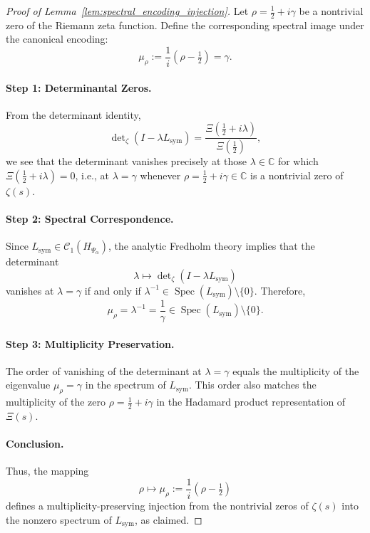 \begin{proof}[Proof of Lemma~\ref{lem:spectral_encoding_injection}]
Let \( \rho = \tfrac{1}{2} + i\gamma \) be a nontrivial zero of the Riemann zeta function. Define the corresponding spectral image under the canonical encoding:
\[
\mu_\rho := \frac{1}{i}(\rho - \tfrac{1}{2}) = \gamma.
\]

\paragraph{Step 1: Determinantal Zeros.}
From the determinant identity,
\[
\det\nolimits_{\zeta}(I - \lambda L_{\mathrm{sym}}) = \frac{\Xi(\tfrac{1}{2} + i\lambda)}{\Xi(\tfrac{1}{2})},
\]
we see that the determinant vanishes precisely at those \( \lambda \in \mathbb{C} \) for which \( \Xi(\tfrac{1}{2} + i\lambda) = 0 \), i.e., at \( \lambda = \gamma \) whenever \( \rho = \tfrac{1}{2} + i\gamma \in \mathbb{C} \) is a nontrivial zero of \( \zeta(s) \).

\paragraph{Step 2: Spectral Correspondence.}
Since \( L_{\mathrm{sym}} \in \mathcal{C}_1(H_{\Psi_\alpha}) \), the analytic Fredholm theory implies that the determinant
\[
\lambda \mapsto \det\nolimits_{\zeta}(I - \lambda L_{\mathrm{sym}})
\]
vanishes at \( \lambda = \gamma \) if and only if \( \lambda^{-1} \in \operatorname{Spec}(L_{\mathrm{sym}}) \setminus \{0\} \). Therefore,
\[
\mu_\rho = \lambda^{-1} = \frac{1}{\gamma} \in \operatorname{Spec}(L_{\mathrm{sym}}) \setminus \{0\}.
\]

\paragraph{Step 3: Multiplicity Preservation.}
The order of vanishing of the determinant at \( \lambda = \gamma \) equals the multiplicity of the eigenvalue \( \mu_\rho = \gamma \) in the spectrum of \( L_{\mathrm{sym}} \). This order also matches the multiplicity of the zero \( \rho = \tfrac{1}{2} + i\gamma \) in the Hadamard product representation of \( \Xi(s) \).

\paragraph{Conclusion.}
Thus, the mapping
\[
\rho \mapsto \mu_\rho := \frac{1}{i}(\rho - \tfrac{1}{2})
\]
defines a multiplicity-preserving injection from the nontrivial zeros of \( \zeta(s) \) into the nonzero spectrum of \( L_{\mathrm{sym}} \), as claimed.
\end{proof}
